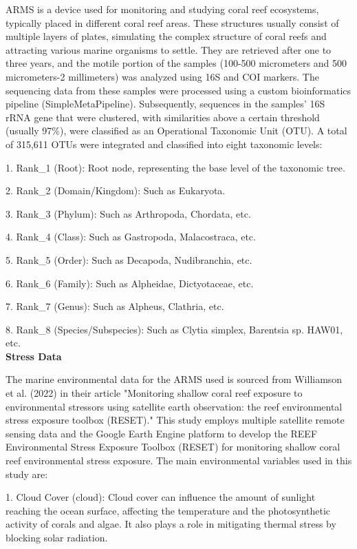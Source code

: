\documentclass[a4paper, 11]{article}
\begin{document}
ARMS is a device used for monitoring and studying coral reef ecosystems, typically placed in different coral reef areas. These structures usually consist of multiple layers of plates, simulating the complex structure of coral reefs and attracting various marine organisms to settle. They are retrieved after one to three years, and the motile portion of the samples (100-500 micrometers and 500 micrometers-2 millimeters) was analyzed using 16S and COI markers. The sequencing data from these samples were processed using a custom bioinformatics pipeline (SimpleMetaPipeline). Subsequently, sequences in the samples' 16S rRNA gene that were clustered, with similarities above a certain threshold (usually 97\%), were classified as an Operational Taxonomic Unit (OTU). A total of 315,611 OTUs were integrated and classified into eight taxonomic levels:

  1. Rank\_1 (Root): Root node, representing the base level of the taxonomic tree.
  
  2. Rank\_2 (Domain/Kingdom): Such as Eukaryota.
  
  3. Rank\_3 (Phylum): Such as Arthropoda, Chordata, etc.
  
  4. Rank\_4 (Class): Such as Gastropoda, Malacostraca, etc.
  
  5. Rank\_5 (Order): Such as Decapoda, Nudibranchia, etc.
  
  6. Rank\_6 (Family): Such as Alpheidae, Dictyotaceae, etc.
  
  7. Rank\_7 (Genus): Such as Alpheus, Clathria, etc.
  
  8. Rank\_8 (Species/Subspecies): Such as Clytia simplex, Barentsia sp. HAW01, etc.\\


\noindent\textbf{Stress Data}

The marine environmental data for the ARMS used is sourced from Williamson et al. (2022) in their article "Monitoring shallow coral reef exposure to environmental stressors using satellite earth observation: the reef environmental stress exposure toolbox (RESET)." This study employs multiple satellite remote sensing data and the Google Earth Engine platform to develop the REEF Environmental Stress Exposure Toolbox (RESET) for monitoring shallow coral reef environmental stress exposure. The main environmental variables used in this study are:

1. Cloud Cover (cloud): Cloud cover can influence the amount of sunlight reaching the ocean surface, affecting the temperature and the photosynthetic activity of corals and algae. It also plays a role in mitigating thermal stress by blocking solar radiation. 
\end{document}
